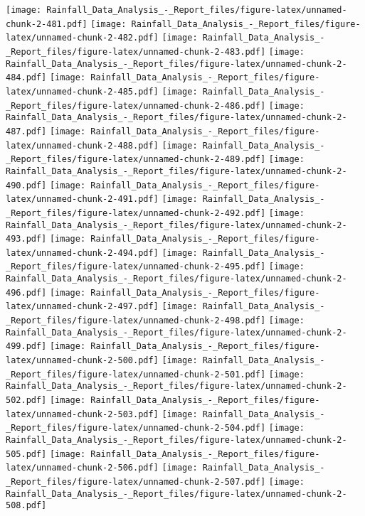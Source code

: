 \documentclass[
]{article}
\begin{document}
\texttt{[image: Rainfall\_Data\_Analysis\_-\_Report\_files/figure-latex/unnamed-chunk-2-481.pdf]}
\texttt{[image: Rainfall\_Data\_Analysis\_-\_Report\_files/figure-latex/unnamed-chunk-2-482.pdf]}
\texttt{[image: Rainfall\_Data\_Analysis\_-\_Report\_files/figure-latex/unnamed-chunk-2-483.pdf]}
\texttt{[image: Rainfall\_Data\_Analysis\_-\_Report\_files/figure-latex/unnamed-chunk-2-484.pdf]}
\texttt{[image: Rainfall\_Data\_Analysis\_-\_Report\_files/figure-latex/unnamed-chunk-2-485.pdf]}
\texttt{[image: Rainfall\_Data\_Analysis\_-\_Report\_files/figure-latex/unnamed-chunk-2-486.pdf]}
\texttt{[image: Rainfall\_Data\_Analysis\_-\_Report\_files/figure-latex/unnamed-chunk-2-487.pdf]}
\texttt{[image: Rainfall\_Data\_Analysis\_-\_Report\_files/figure-latex/unnamed-chunk-2-488.pdf]}
\texttt{[image: Rainfall\_Data\_Analysis\_-\_Report\_files/figure-latex/unnamed-chunk-2-489.pdf]}
\texttt{[image: Rainfall\_Data\_Analysis\_-\_Report\_files/figure-latex/unnamed-chunk-2-490.pdf]}
\texttt{[image: Rainfall\_Data\_Analysis\_-\_Report\_files/figure-latex/unnamed-chunk-2-491.pdf]}
\texttt{[image: Rainfall\_Data\_Analysis\_-\_Report\_files/figure-latex/unnamed-chunk-2-492.pdf]}
\texttt{[image: Rainfall\_Data\_Analysis\_-\_Report\_files/figure-latex/unnamed-chunk-2-493.pdf]}
\texttt{[image: Rainfall\_Data\_Analysis\_-\_Report\_files/figure-latex/unnamed-chunk-2-494.pdf]}
\texttt{[image: Rainfall\_Data\_Analysis\_-\_Report\_files/figure-latex/unnamed-chunk-2-495.pdf]}
\texttt{[image: Rainfall\_Data\_Analysis\_-\_Report\_files/figure-latex/unnamed-chunk-2-496.pdf]}
\texttt{[image: Rainfall\_Data\_Analysis\_-\_Report\_files/figure-latex/unnamed-chunk-2-497.pdf]}
\texttt{[image: Rainfall\_Data\_Analysis\_-\_Report\_files/figure-latex/unnamed-chunk-2-498.pdf]}
\texttt{[image: Rainfall\_Data\_Analysis\_-\_Report\_files/figure-latex/unnamed-chunk-2-499.pdf]}
\texttt{[image: Rainfall\_Data\_Analysis\_-\_Report\_files/figure-latex/unnamed-chunk-2-500.pdf]}
\texttt{[image: Rainfall\_Data\_Analysis\_-\_Report\_files/figure-latex/unnamed-chunk-2-501.pdf]}
\texttt{[image: Rainfall\_Data\_Analysis\_-\_Report\_files/figure-latex/unnamed-chunk-2-502.pdf]}
\texttt{[image: Rainfall\_Data\_Analysis\_-\_Report\_files/figure-latex/unnamed-chunk-2-503.pdf]}
\texttt{[image: Rainfall\_Data\_Analysis\_-\_Report\_files/figure-latex/unnamed-chunk-2-504.pdf]}
\texttt{[image: Rainfall\_Data\_Analysis\_-\_Report\_files/figure-latex/unnamed-chunk-2-505.pdf]}
\texttt{[image: Rainfall\_Data\_Analysis\_-\_Report\_files/figure-latex/unnamed-chunk-2-506.pdf]}
\texttt{[image: Rainfall\_Data\_Analysis\_-\_Report\_files/figure-latex/unnamed-chunk-2-507.pdf]}
\texttt{[image: Rainfall\_Data\_Analysis\_-\_Report\_files/figure-latex/unnamed-chunk-2-508.pdf]}
\end{document}
